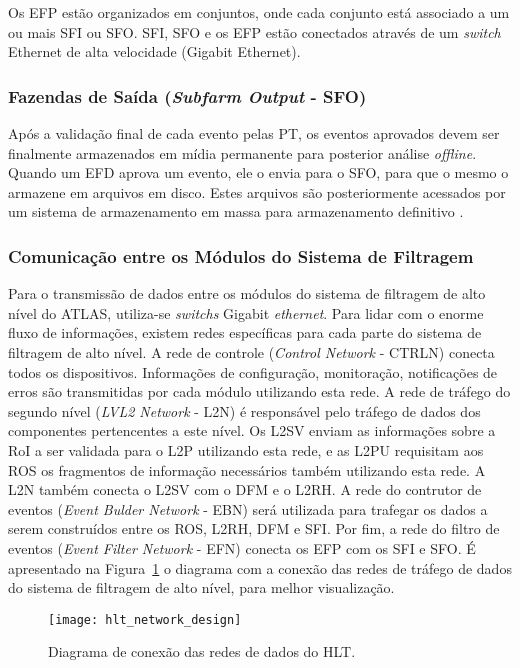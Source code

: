 Os EFP estão organizados em conjuntos, onde cada conjunto está associado a um ou mais SFI ou SFO. SFI, SFO e os EFP estão conectados através de um \emph{switch} Ethernet de alta velocidade (Gigabit Ethernet).


\subsubsection{Fazendas de Saída (\emph{Subfarm Output} - SFO)}

Após a validação final de cada evento pelas PT, os eventos aprovados devem ser finalmente  armazenados em mídia permanente para posterior análise \emph{offline}. Quando um EFD aprova um evento, ele o envia para o SFO, para que o mesmo o armazene em arquivos em disco. Estes arquivos são posteriormente acessados por um sistema de armazenamento em massa para armazenamento definitivo \cite{bib:tdaq_tdr}.


\subsubsection{Comunicação entre os Módulos do Sistema de Filtragem}

Para o transmissão de dados entre os módulos do sistema de filtragem de alto nível do ATLAS, utiliza-se \emph{switchs} Gigabit \emph{ethernet}. Para lidar com o enorme fluxo de informações, existem redes específicas para cada parte do sistema de filtragem de alto nível. A rede de controle (\emph{Control Network} - CTRLN) conecta todos os dispositivos. Informações de configuração, monitoração, notificações de erros são transmitidas por cada módulo utilizando esta rede. A rede de tráfego do segundo nível (\emph{LVL2 Network} - L2N) é responsável pelo tráfego de dados dos componentes pertencentes a este nível. Os L2SV enviam as informações sobre a RoI a ser validada para o L2P utilizando esta rede, e as L2PU requisitam aos ROS os fragmentos de informação necessários também utilizando esta rede. A L2N também conecta o L2SV com o DFM e o L2RH. A rede do contrutor de eventos (\emph{Event Bulder Network} - EBN) será utilizada para trafegar os dados a serem construídos entre os ROS, L2RH, DFM e SFI. Por fim, a rede do filtro de eventos (\emph{Event Filter Network} - EFN) conecta os EFP com os SFI e SFO. É apresentado na Figura~\ref{fig:net_design} o diagrama com a conexão das redes de tráfego de dados do sistema de filtragem de alto nível, para melhor visualização.

\begin{figure}
\begin{center}
\texttt{[image: hlt\_network\_design]}
\caption{Diagrama de conexão das redes de dados do HLT.}
\label{fig:net_design}
\end{center}
\end{figure}


